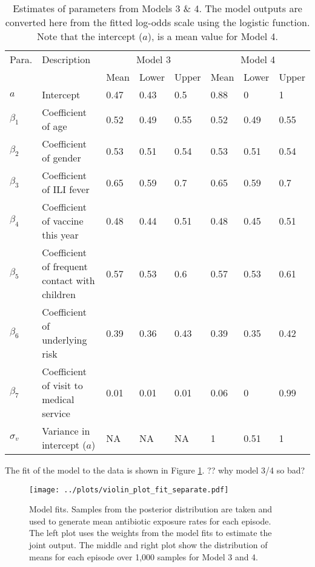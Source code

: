 \documentclass{article}
\begin{document}
\begin{table}[ht]
\centering
\begin{tabular}{|p{1cm}|p{6cm}|p{0.8cm}p{0.8cm}p{0.8cm}|p{0.8cm}p{0.8cm}p{0.8cm}|}
\hline
Para. & Description & \multicolumn{3}{|c|}{Model 3} & \multicolumn{3}{|c|}{Model 4} \\ 
 & & Mean & Lower & Upper & Mean & Lower & Upper \\
 \hline
$a$ & Intercept & 0.47 & 0.43 & 0.5 & 0.88 & 0 & 1 \\ 
  $\beta_1$ & Coefficient of age & 0.52 & 0.49 & 0.55 & 0.52 & 0.49 &0.55 \\ 
  $\beta_2$ & Coefficient of gender & 0.53 & 0.51 & 0.54 & 0.53 & 0.51 & 0.54 \\ 
  $\beta_3$ & Coefficient of ILI fever & 0.65 & 0.59 & 0.7 & 0.65 & 0.59 & 0.7 \\ 
  $\beta_4$ & Coefficient of vaccine this year & 0.48 & 0.44 & 0.51 & 0.48 & 0.45 & 0.51 \\ 
  $\beta_5$ & Coefficient of frequent contact with children & 0.57 & 0.53 & 0.6 & 0.57 & 0.53 & 0.61 \\ 
  $\beta_6$ & Coefficient of underlying risk & 0.39 & 0.36 & 0.43 & 0.39 & 0.35 & 0.42 \\ 
  $\beta_7$ & Coefficient of visit to medical service & 0.01 & 0.01 & 0.01 & 0.06 & 0 & 0.99 \\ 
  $\sigma_v$ & Variance in intercept ($a$) & NA & NA & NA & 1 & 0.51 & 1 \\ \hline
\end{tabular}
\caption{Estimates of parameters from Models 3 \& 4. The model outputs are converted here from the fitted log-odds scale using the logistic function. Note that the intercept ($a$), is a mean value for Model 4.}
\label{tab:paraest}
\end{table}

The fit of the model to the data is shown in Figure \ref{fig:fit}. ?? why model 3/4 so bad?

\begin{figure}[htbp]
	\centering
	\texttt{[image: ../plots/violin\_plot\_fit\_separate.pdf]}
	\caption{Model fits. Samples from the posterior distribution are taken and used to generate mean antibiotic exposure rates for each episode. The left plot uses the weights from the model fits to estimate the joint output. The middle and right plot show the distribution of means for each episode over 1,000 samples for Model 3 and 4.}
	\label{fig:fit}
\end{figure}
\end{document}
